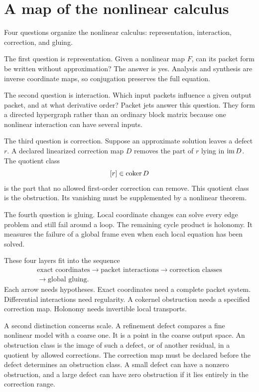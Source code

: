 \section{A map of the nonlinear calculus}\label{sec:map}

Four questions organize the nonlinear calculus: representation, interaction, correction, and gluing.

The first question is representation.  Given a nonlinear map $F$, can its packet form be written without approximation?  The answer is yes.  Analysis and synthesis are inverse coordinate maps, so conjugation preserves the full equation.

The second question is interaction.  Which input packets influence a given output packet, and at what derivative order?  Packet jets answer this question.  They form a directed hypergraph rather than an ordinary block matrix because one nonlinear interaction can have several inputs.

The third question is correction.  Suppose an approximate solution leaves a defect $r$.  A declared linearized correction map $D$ removes the part of $r$ lying in $\operatorname{im} D$.  The quotient class
\[
[r]\in\operatorname{coker} D
\]
is the part that no allowed first-order correction can remove.  This quotient class is the obstruction.  Its vanishing must be supplemented by a nonlinear theorem.

The fourth question is gluing.  Local coordinate changes can solve every edge problem and still fail around a loop.  The remaining cycle product is holonomy.  It measures the failure of a global frame even when each local equation has been solved.

These four layers fit into the sequence
\[
\begin{gathered}
\text{exact coordinates}
\longrightarrow
\text{packet interactions}
\longrightarrow
\text{correction classes}
\\
\longrightarrow
\text{global gluing}.
\end{gathered}
\]
Each arrow needs hypotheses.  Exact coordinates need a complete packet system.  Differential interactions need regularity.  A cokernel obstruction needs a specified correction map.  Holonomy needs invertible local transports.

A second distinction concerns scale.  A refinement defect compares a fine nonlinear model with a coarse one.  It is a point in the coarse output space.  An obstruction class is the image of such a defect, or of another residual, in a quotient by allowed corrections.  The correction map must be declared before the defect determines an obstruction class.  A small defect can have a nonzero obstruction, and a large defect can have zero obstruction if it lies entirely in the correction range.

